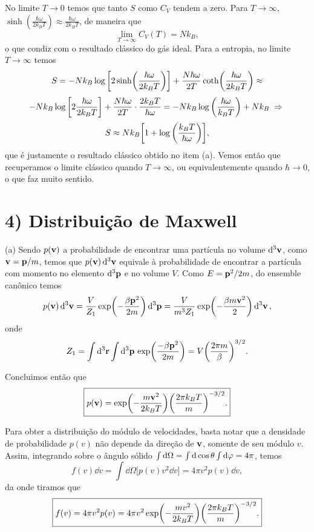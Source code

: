 \documentclass[a4paper,10pt]{article}
\begin{document}
No limite $T \to 0$ temos que tanto $S$ como $C_V$ tendem a zero. Para $T \to \infty$, $\sinh(\frac{\hbar\omega}{2k_B T}) \approx \frac{\hbar\omega}{2k_B T}$, de maneira que
$$
\lim_{T\to\infty} C_V(T) = N k_B,
$$
o que condiz com o resultado clássico do gás ideal. Para a entropia, no limite $T \to \infty$ temos
$$
S = - N k_B \log\qty[2 \sinh(\frac{\hbar\omega}{2 k_B T})] + \frac{N\hbar\omega}{2 T} \coth(\frac{\hbar\omega}{2 k_B T})
\approx
$$
$$
- N k_B \log\qty[2 \frac{\hbar\omega}{2 k_B T}] +
\frac{N\hbar\omega}{2 T}\cdot\frac{2 k_B T}{\hbar\omega} =
- N k_B \log\qty(\frac{\hbar\omega}{k_B T}) + N k_B \; \Rightarrow \;
$$
$$
S \approx
N k_B \qty[1 + \log\qty(\frac{k_B T}{\hbar\omega})],
$$
que é justamente o resultado clássico obtido no item (a). Vemos então que recuperamos o limite clássico quando $T \to \infty$, ou equivalentemente quando $\hbar \to 0$, o que faz muito sentido.



\pagebreak

\section*{4) Distribuição de Maxwell}

(a) Sendo $p(\vb{v})$ a probabilidade de encontrar uma partícula no volume $\dd[3]{\vb{v}}$, como $\vb{v} = \vb{p}/m$, temos que $p(\vb{v}) \dd[3]{\vb{v}}$ equivale à probabilidade de encontrar a partícula com momento no elemento $\dd[3]{\vb{p}}$ e no volume $V$. Como $E = \vb{p}^2/2m$, do ensemble canônico temos
$$
p(\vb{v}) \dd[3]{\vb{v}} = \frac{V}{Z_1} \exp(- \frac{\beta \vb{p}^2}{2m}) \dd[3]{\vb{p}} = \frac{V}{m^3 Z_1} \exp(- \frac{\beta m \vb{v}^2}{2}) \dd[3]{\vb{v}},
$$
onde
$$
Z_1 = \int \dd[3]{\vb{r}} \int \dd[3]{\vb{p}} \, \exp(\frac{-\beta \vb{p}^2}{2m}) = V \qty(\frac{2\pi m}{\beta})^{3/2}.
$$

Concluimos então que
$$
\boxed{ p(\vb{v}) = \exp(-\frac{m \vb{v}^2}{2 k_B T}) \qty(\frac{2\pi k_B T}{m})^{-3/2}. }
$$

Para obter a distribuição do módulo de velocidades, basta notar que a densidade de probabilidade $p(v)$ não depende da direção de $\vb{v}$, somente de seu módulo $v$. Assim, integrando sobre o ângulo sólido $\int \dd{\Omega} = \int \dd{\cos\theta} \int \dd{\varphi} = 4\pi$, temos
$$
f(v) \dd{v} = \int \dd{\Omega} \Big[ p(v) v^2 \dd{v} \Big] = 4\pi v^2 p(v) \dd{v},
$$
da onde tiramos que
$$
\boxed{ f(v) = 4 \pi v^2 p(v) = 4 \pi v^2 \exp(-\frac{m v^2}{2 k_B T}) \qty(\frac{2\pi k_B T}{m})^{-3/2}. }
$$
\end{document}
